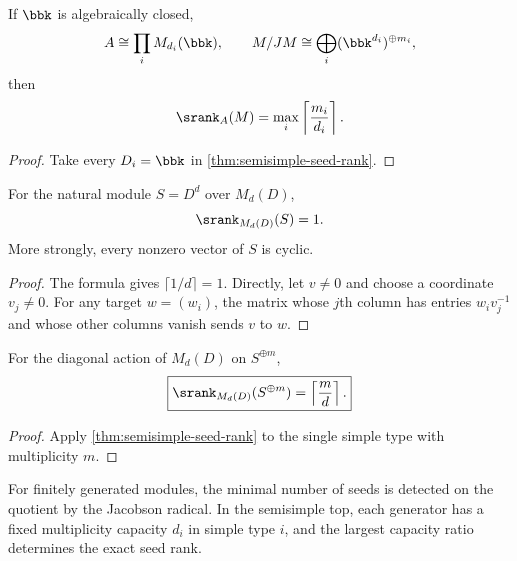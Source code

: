 \begin{corollary}
\label{cor:algebraically-closed-formula}
If $\bbk$ is algebraically closed,
\[
A\cong\prod_iM_{d_i}(\bbk),
\qquad
M/JM\cong\bigoplus_i(\bbk^{d_i})^{\oplus m_i},
\]
then
\[
\srank_A(M)=\max_i\left\lceil\frac{m_i}{d_i}\right\rceil.
\]
\end{corollary}

\begin{proof}
Take every $D_i=\bbk$ in \cref{thm:semisimple-seed-rank}.
\end{proof}

\begin{corollary}
\label{cor:full-matrix}
For the natural module $S=D^d$ over $M_d(D)$,
\[
\srank_{M_d(D)}(S)=1.
\]
More strongly, every nonzero vector of $S$ is cyclic.
\end{corollary}

\begin{proof}
The formula gives $\lceil1/d\rceil=1$.  Directly, let $v\neq0$ and choose a coordinate $v_j\neq0$.  For any target $w=(w_i)$, the matrix whose $j$th column has entries $w_iv_j^{-1}$ and whose other columns vanish sends $v$ to $w$.
\end{proof}

\begin{corollary}
\label{cor:multiplicity-obstruction}
For the diagonal action of $M_d(D)$ on $S^{\oplus m}$,
\[
\boxed{
\srank_{M_d(D)}(S^{\oplus m})
=
\left\lceil\frac{m}{d}\right\rceil.
}
\]
\end{corollary}

\begin{proof}
Apply \cref{thm:semisimple-seed-rank} to the single simple type with multiplicity $m$.
\end{proof}

\begin{sectionrecap}
For finitely generated modules, the minimal number of seeds is detected on the quotient by the Jacobson radical.  In the semisimple top, each generator has a fixed multiplicity capacity \(d_i\) in simple type \(i\), and the largest capacity ratio determines the exact seed rank.
\end{sectionrecap}

